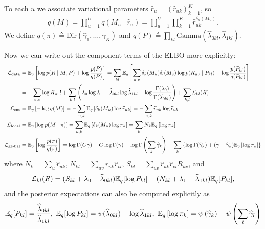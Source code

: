 \documentclass{article}
\begin{document}
 To each $u$ we associate variational parameters $\widehat r_u = \left(\widehat r_{uk}\right)_{k=1}^K$, so
\begin{align}
q(M) = \prod_{u=1}^U q(M_u\mid \widehat r_u) 
= \prod_{u=1}^U \prod_{k=1}^K \widehat r_{uk}^{\delta_k(M_u)}.
\end{align}
We define 
$q(\pi) \triangleq \text{Dir}(\widehat \gamma_1, \dots, \widehat \gamma_K)$ and $q(P) \triangleq \prod_{kl}\text{Gamma}(\widehat \lambda_{0kl},\widehat \lambda_{1kl})$. %

 Now we can write out the component terms of the ELBO more explicitly:
\begin{equation*}
\begin{split}
\mathcal{L}_{\text{data}}
&= \mathbb{E}_q\left[\log p(R\mid M,P)+ \log\frac{p(P)}{q(P)}\right]
= \sum_{kl}\mathbb{E}_q\left[\sum_{u,v}\delta_{k}(M_u)\delta_l(M_v)\log p(R_{uv}\mid P_{kl})+ \log\frac{p(P_{kl})}{q(P_{kl})}\right] \\
&= -\sum_{u,v}\log R_{uv}! + \sum_{k,l} \left(\lambda_{0}\log\lambda_1-\widehat\lambda_{0kl}\log\widehat\lambda_{1kl} - \log\frac{\Gamma(\lambda_0)}{\Gamma(\widehat\lambda_{0kl})}\right) + \sum_{k,l} \mathcal{L}_{kl}(R)
~\\
\mathcal{L}_{\text{ent}}
&= \mathbb{E}_q\left[-\log q(M)\right]
= -\sum_{u,k}\mathbb{E}_q\left[\delta_{k}(M_u)\log \widehat r_{uk}\right]
= -\sum_{u,k}\widehat r_{uk}\log \widehat r_{uk}
~\\
\mathcal{L}_{\text{local}}
&= \mathbb{E}_q\left[\log p(M\mid \pi)\right]
= \sum_{u,k}\mathbb{E}_q\left[\delta_{k}(M_u)\log \pi_k\right]
= \sum_{k}N_k\mathbb{E}_q\left[\log \pi_k\right]
~\\
\mathcal{L}_{\text{global}}
&= \mathbb{E}_q\left[\log\frac{p(\pi)}{q(\pi)}\right]
= \log \Gamma(C\gamma) - C\log\Gamma(\gamma) -\log \Gamma\left(\sum_k\widehat\gamma_k\right) + \sum_k\left\{\log\Gamma(\widehat\gamma_k)+ (\gamma-\widehat\gamma_k)\mathbb{E}_q\left[\log \pi_k\right]\right\}
\end{split}
\end{equation*}
where $N_k = \sum_{u}\widehat r_{uk}$, $N_{kl} = \sum_{uv}\widehat r_{uk}\widehat r_{vl}$, $S_{kl} = \sum_{uv}\widehat r_{uk}\widehat r_{vl} R_{uv}$, and 
$$
\mathcal{L}_{kl}(R) 
= (S_{kl} + \lambda_{0} - \widehat\lambda_{0kl}) \mathbb{E}_q[\log P_{kl}]
   -(N_{kl} + \lambda_{1} - \widehat\lambda_{1kl}) \mathbb{E}_q[P_{kl}], 
$$
and the posterior expectations can also be computed explicitly as 
$$
\mathbb{E}_q[P_{kl}] =  \frac{\widehat\lambda_{0kl}}{\widehat\lambda_{1kl}}, ~
\mathbb{E}_q[\log P_{kl}] = \psi(\widehat\lambda_{0kl}) - \log \widehat\lambda_{1kl}, ~
\mathbb{E}_q\left[\log \pi_k\right] = \psi\left(\widehat\gamma_k\right) - \psi\left(\sum_l\widehat\gamma_l\right)
$$
\end{document}
